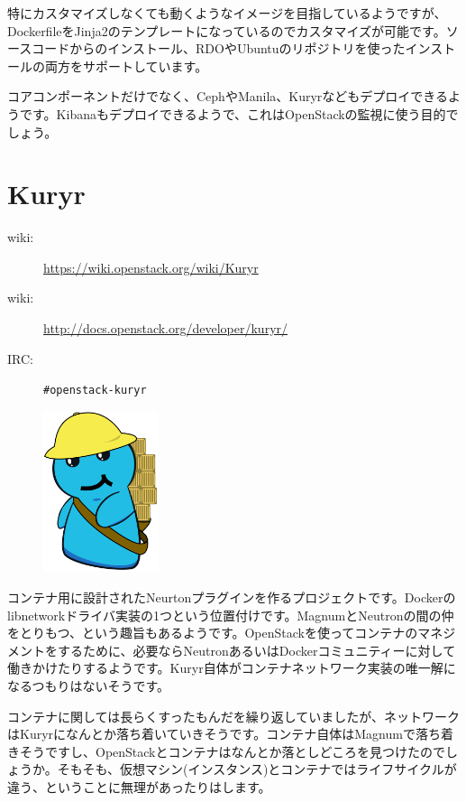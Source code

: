 特にカスタマイズしなくても動くようなイメージを目指しているようですが、DockerfileをJinja2のテンプレートになっているのでカスタマイズが可能です。ソースコードからのインストール、RDOやUbuntuのリポジトリを使ったインストールの両方をサポートしています。

コアコンポーネントだけでなく、CephやManila、Kuryrなどもデプロイできるようです。Kibanaもデプロイできるようで、これはOpenStackの監視に使う目的でしょう。

\section{Kuryr}

\begin{description}
	\item[wiki:] \url{https://wiki.openstack.org/wiki/Kuryr}
	\item[wiki:] \url{http://docs.openstack.org/developer/kuryr/}
	\item[IRC:] \verb|#openstack-kuryr|
\end{description}

\begin{figure}
	\begin{center}
		\includegraphics[width=0.3\textwidth]{img/kuryr_logo.png}
	\end{center}
\end{figure}

コンテナ用に設計されたNeurtonプラグインを作るプロジェクトです。Dockerのlibnetworkドライバ実装の1つという位置付けです。MagnumとNeutronの間の仲をとりもつ、という趣旨もあるようです。OpenStackを使ってコンテナのマネジメントをするために、必要ならNeutronあるいはDockerコミュニティーに対して働きかけたりするようです。Kuryr自体がコンテナネットワーク実装の唯一解になるつもりはないそうです。

コンテナに関しては長らくすったもんだを繰り返していましたが、ネットワークはKuryrになんとか落ち着いていきそうです。コンテナ自体はMagnumで落ち着きそうですし、OpenStackとコンテナはなんとか落としどころを見つけたのでしょうか。そもそも、仮想マシン(インスタンス)とコンテナではライフサイクルが違う、ということに無理があったりはします。

